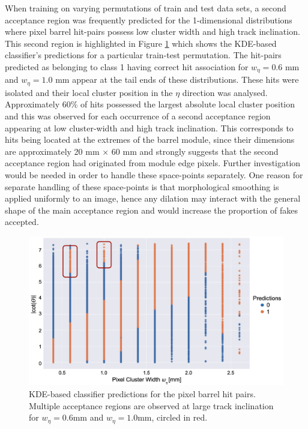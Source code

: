When training on varying permutations of train and test data sets, a second acceptance region was frequently predicted for the 1-dimensional distributions where pixel barrel hit-pairs possess low cluster width and high track inclination. This second region is highlighted in Figure \ref{fig:multiple-acceptance} which shows the KDE-based classifier's predictions for a particular train-test permutation. The hit-pairs predicted as belonging to class 1 having correct hit association for $w_{\eta} = 0.6$ mm and $w_{\eta} = 1.0$ mm appear at the tail ends of these distributions. These hits were isolated and their local cluster position in the $\eta$ direction was analysed. Approximately 60\% of hits possessed the largest absolute local cluster position and this was observed for each occurrence of a second acceptance region appearing at low cluster-width and high track inclination. This corresponds to hits being located at the extremes of the barrel module, since their dimensions are approximately 20 mm $\times$ 60 mm \cite{pixel-module-dimensions} and strongly suggests that the second acceptance region had originated from module edge pixels. Further investigation would be needed in order to handle these space-points separately. One reason for separate handling of these space-points is that morphological smoothing is applied uniformly to an image, hence any dilation may interact with the general shape of the main acceptance region and would increase the proportion of fakes accepted.

\begin{figure}[!htbp]
\centering
\includegraphics[width=0.98\linewidth]{images/4-ml-based-predictor/Multiple_acceptance_regions.png}
\caption{KDE-based classifier predictions for the pixel barrel hit pairs. Multiple acceptance regions are observed at large track inclination for $w_{\eta} = 0.6$mm and $w_{\eta} = 1.0$mm, circled in red.}
\label{fig:multiple-acceptance}
\end{figure}


